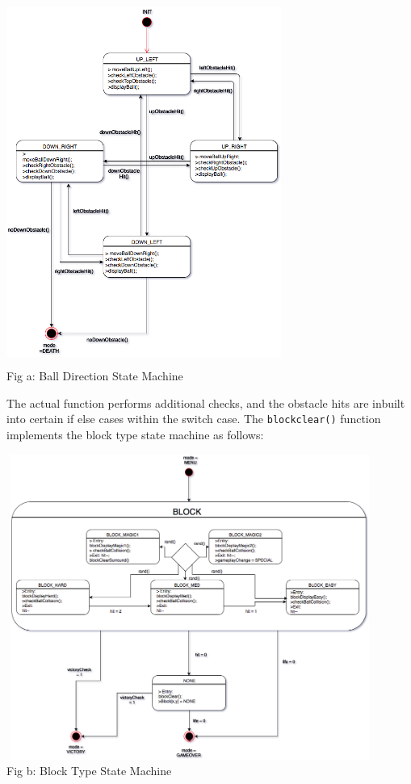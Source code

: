 \documentclass{article}
\begin{document}
\begin{center}
\includegraphics[width=9cm, height=12cm]{ballDirectionStatemachine}
\\ {\small Fig a: Ball Direction State Machine}
\end{center}
\qquad The actual function performs additional checks, and the obstacle hits are inbuilt into certain if else cases within the switch case. The \texttt{blockclear()} function implements the block type state machine as follows:
\begin{center}
\includegraphics[width=12cm, height=10cm]{brickTypeStatemachine}
\\ {\small Fig b: Block Type State Machine}
\end{center}
\end{document}
